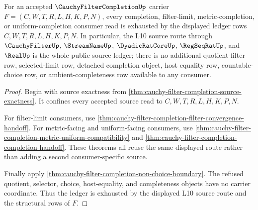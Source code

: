 \begin{theorem}
\label{thm:cauchy-filter-completion-ledger-exhaustion}
For an accepted $\CauchyFilterCompletionUp$ carrier $F=(C,W,T,R,L,H,K,P,N)$, every completion, filter-limit, metric-completion, or uniform-completion consumer read is exhausted by the displayed ledger rows $C,W,T,R,L,H,K,P,N$. In particular, the L10 source route through $\CauchyFilterUp$, $\StreamNameUp$, $\DyadicRatCoreUp$, $\RegSeqRatUp$, and $\RealUp$ is the whole public source ledger; there is no additional quotient-filter row, selected-limit row, detached completion object, host equality row, countable-choice row, or ambient-completeness row available to any consumer.
\end{theorem}
\begin{proof}
Begin with source exactness from \autoref{thm:cauchy-filter-completion-source-exactness}. It confines every accepted source read to $C,W,T,R,L,H,K,P,N$.

For filter-limit consumers, use \autoref{thm:cauchy-filter-completion-filter-convergence-handoff}. For metric-facing and uniform-facing consumers, use \autoref{thm:cauchy-filter-completion-metric-uniform-compatibility} and \autoref{thm:cauchy-filter-completion-completion-handoff}. These theorems all reuse the same displayed route rather than adding a second consumer-specific source.

Finally apply \autoref{thm:cauchy-filter-completion-non-choice-boundary}. The refused quotient, selector, choice, host-equality, and completeness objects have no carrier coordinate. Thus the ledger is exhausted by the displayed L10 source route and the structural rows of $F$.
\end{proof}
